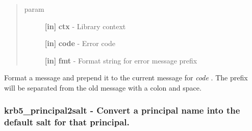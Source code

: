\documentclass[letterpaper,10pt,english]{sphinxmanual}
\begin{document}
\begin{fulllineitems}
\label{appdev/refs/api/krb5_prepend_error_message:c.krb5_prepend_error_message}
\end{fulllineitems}

\begin{quote}\begin{description}
\item[{param}] \leavevmode
\textbf{{[}in{]}} \textbf{ctx} - Library context

\textbf{{[}in{]}} \textbf{code} - Error code

\textbf{{[}in{]}} \textbf{fmt} - Format string for error message prefix

\end{description}\end{quote}

Format a message and prepend it to the current message for \emph{code} . The prefix will be separated from the old message with a colon and space.


\subsubsection{krb5\_principal2salt -  Convert a principal name into the default salt for that principal.}
\label{appdev/refs/api/krb5_principal2salt:krb5-principal2salt-convert-a-principal-name-into-the-default-salt-for-that-principal}\label{appdev/refs/api/krb5_principal2salt::doc}

\begin{fulllineitems}
\label{appdev/refs/api/krb5_principal2salt:c.krb5_principal2salt}
\end{fulllineitems}
\end{document}
